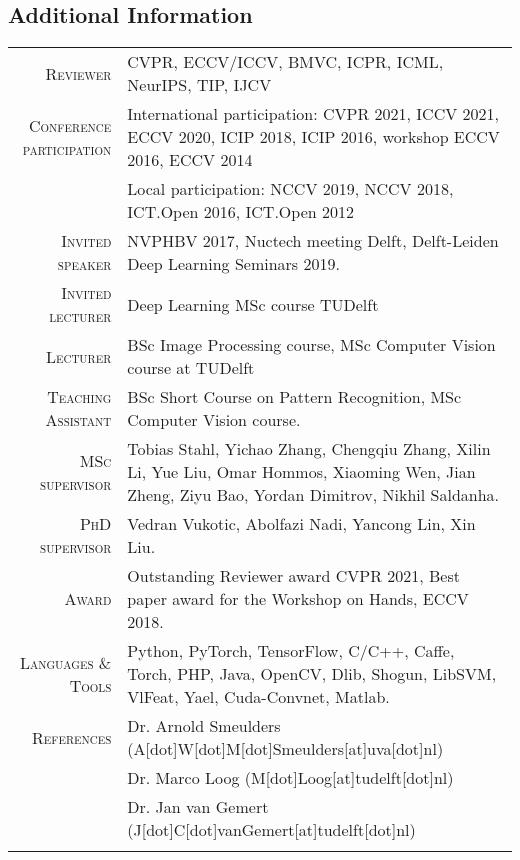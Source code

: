 \documentclass[a4paper, oneside, final]{scrartcl}
\begin{document}
\begin{center}
		\section{Additional Information}
		\begin{tabular}{r@{\hskip 0.3in}p{11.3cm}}
            \textsc{Reviewer}                   & CVPR, ECCV/ICCV, BMVC, ICPR, ICML, NeurIPS, TIP, IJCV\\
            \textsc{Conference participation}   & International participation: CVPR 2021, ICCV 2021, ECCV 2020, ICIP 2018, ICIP 2016, workshop ECCV 2016, ECCV 2014\\
                                                & Local participation: NCCV 2019, NCCV 2018, ICT.Open 2016, ICT.Open 2012\\
            \textsc{Invited speaker}            & NVPHBV 2017, Nuctech meeting Delft, Delft-Leiden Deep Learning Seminars 2019.\\
            \textsc{Invited lecturer}           & Deep Learning MSc course TUDelft\\
			\textsc{Lecturer}		            & BSc Image Processing course, MSc Computer Vision course at TUDelft\\
            \textsc{Teaching Assistant}         & BSc Short Course on Pattern Recognition, MSc Computer Vision course.\\ 
			\textsc{MSc supervisor}             & Tobias Stahl, Yichao Zhang, Chengqiu Zhang, Xilin Li, Yue Liu, Omar Hommos, Xiaoming Wen, Jian Zheng, Ziyu Bao, Yordan Dimitrov, Nikhil Saldanha.\\
			\textsc{PhD supervisor}             & Vedran Vukotic, Abolfazi Nadi, Yancong Lin, Xin Liu.\\[5px] 
            \textsc{Award}                      & Outstanding Reviewer award CVPR 2021, Best paper award for the Workshop on Hands, ECCV 2018.\\  
			\textsc{Languages \& Tools}         & Python, PyTorch, TensorFlow, C\slash C++, Caffe, Torch, PHP, 
                                                Java, OpenCV, Dlib, Shogun, LibSVM, VlFeat, Yael, Cuda-Convnet, Matlab.\\

			\textsc{References} & Dr. Arnold Smeulders (A[dot]W[dot]M[dot]Smeulders[at]uva[dot]nl)\\
                                & Dr. Marco Loog (M[dot]Loog[at]tudelft[dot]nl)\\
                                & Dr. Jan van Gemert (J[dot]C[dot]vanGemert[at]tudelft[dot]nl)\\
			\multicolumn{2}{c}{}\\
		\end{tabular}
	\end{center}
\end{document}
